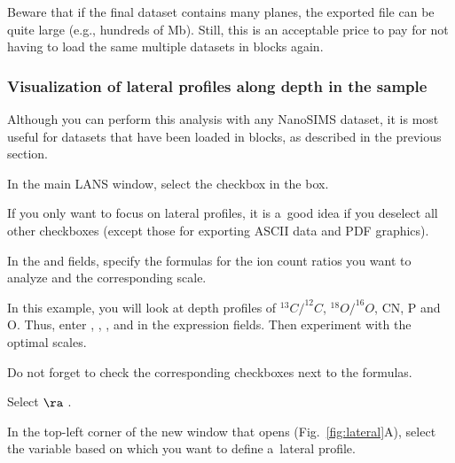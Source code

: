 \bul Beware that if the final dataset contains many planes, the exported  file can be quite large (e.g., hundreds of Mb). Still, this is an acceptable price to pay for not having to load the same multiple datasets in blocks again.


\subsubsection{Visualization of lateral profiles along depth in the sample}
\setcounter{step}{0}

Although you can perform this analysis with any NanoSIMS dataset, it is most useful for datasets that have been loaded in blocks, as described in the previous section.

\s In the main LANS window, select the  checkbox in the  box. 

\bul If you only want to focus on lateral profiles, it is a~good idea if you deselect all other checkboxes (except those for exporting ASCII data and PDF graphics).

\s In the  and  fields, specify the formulas for the ion count ratios you want to analyze and the corresponding scale. 

\bul In this example, you will look at depth profiles of ${}^{13}C/^{12}C$, ${}^{18}O/^{16}O$, CN, P and O. Thus, enter , , ,  and  in the expression fields. Then experiment with the optimal scales.

\bul Do not forget to check the corresponding checkboxes next to the formulas.

\s Select  $\ra$ . 

\s In the top-left corner of the new window that opens (Fig.~\ref{fig:lateral}A), select the variable based on which you want to define a~lateral profile.

